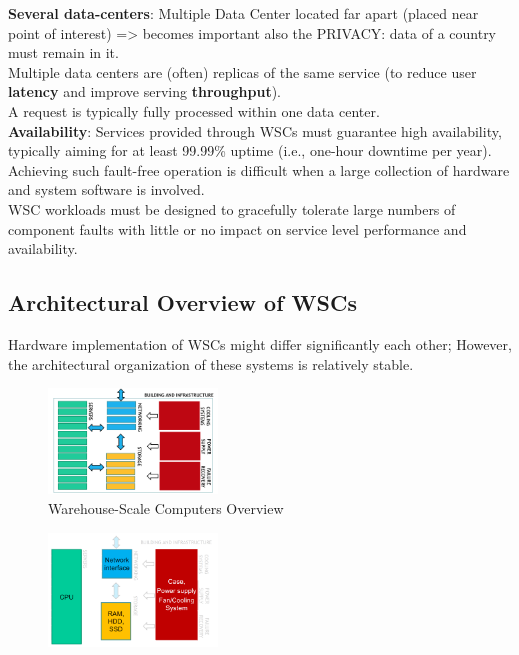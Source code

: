 \documentclass[10pt, oneside]{article}
\begin{document}
{\bf Several data-centers}:
Multiple Data Center located far apart (placed near point of interest) => becomes important also the PRIVACY: data of a country must remain in it.\\
Multiple data centers are (often) replicas of the same service (to reduce user {\bf latency} and improve serving {\bf throughput}).\\
A request is typically fully processed within one data center.\\
{\bf Availability}:
Services provided through WSCs must guarantee high availability, typically aiming for at least 99.99\% uptime (i.e., one-hour downtime per year). Achieving such fault-free operation is difficult when a large collection of hardware and system software is involved.\\
WSC workloads must be designed to gracefully tolerate large numbers of component faults with little or no impact on service level performance and availability.

\subsection{Architectural Overview of WSCs}
Hardware implementation of WSCs might differ significantly each other; However, the architectural organization of these systems is relatively stable.
\begin{multicols}{2}
\begin{figure}[H]
    \begin{center}
    \includegraphics[width=0.4\textwidth]{img/img6.png}
    \caption{Warehouse-Scale Computers Overview}
    \label{fig:WSCs overview}
    \end{center}
\end{figure}
\columnbreak
\begin{figure}[H]
    \begin{center}
    \includegraphics[width=0.4\textwidth]{img/img7.png}
    \caption{}
    \label{fig:WSCs overview2}
    \end{center}
\end{figure}
\end{multicols}
\end{document}
